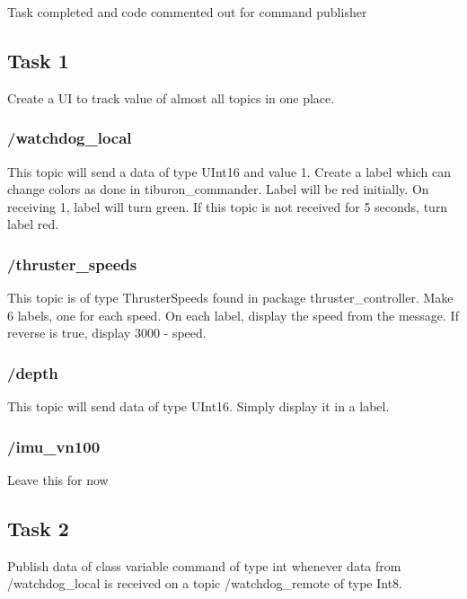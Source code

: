 Task completed and code commented out for \textquotesingle{}command\textquotesingle{} publisher \subsection*{Task 1}

Create a UI to track value of almost all topics in one place.

\subsubsection*{{\ttfamily /watchdog\+\_\+local}}

This topic will send a data of type U\+Int16 and value 1. Create a label which can change colors as done in {\ttfamily tiburon\+\_\+commander}. Label will be red initially. On receiving 1, label will turn green. If this topic is not received for 5 seconds, turn label red.

\subsubsection*{{\ttfamily /thruster\+\_\+speeds}}

This topic is of type {\ttfamily Thruster\+Speeds} found in package {\ttfamily thruster\+\_\+controller}. Make 6 labels, one for each speed. On each label, display the speed from the message. If reverse is true, display 3000 -\/ speed.

\subsubsection*{{\ttfamily /depth}}

This topic will send data of type U\+Int16. Simply display it in a label.

\subsubsection*{{\ttfamily /imu\+\_\+vn100}}

Leave this for now

\subsection*{Task 2}

Publish data of class variable {\ttfamily command} of type int whenever data from {\ttfamily /watchdog\+\_\+local} is received on a topic {\ttfamily /watchdog\+\_\+remote} of type Int8. 